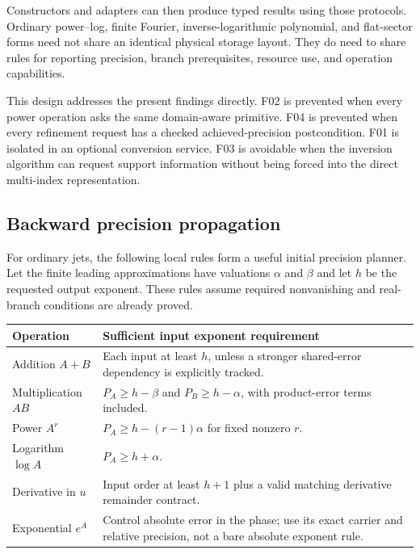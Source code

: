 \documentclass[11pt,a4paper]{article}
\theoremstyle{definition}
\begin{document}
Constructors and adapters can then produce typed results using those protocols. Ordinary power--log, finite Fourier, inverse-logarithmic polynomial, and flat-sector forms need not share an identical physical storage layout. They do need to share rules for reporting precision, branch prerequisites, resource use, and operation capabilities.

This design addresses the present findings directly. F02 is prevented when every power operation asks the same domain-aware primitive. F04 is prevented when every refinement request has a checked achieved-precision postcondition. F01 is isolated in an optional conversion service. F03 is avoidable when the inversion algorithm can request support information without being forced into the direct multi-index representation.

\subsection{Backward precision propagation}

For ordinary jets, the following local rules form a useful initial precision planner. Let the finite leading approximations have valuations $\alpha$ and $\beta$ and let $h$ be the requested output exponent. These rules assume required nonvanishing and real-branch conditions are already proved.
\begin{center}
\begin{tabularx}{\linewidth}{@{}P{32mm}Y@{}}
\toprule
Operation & Sufficient input exponent requirement\\
\midrule
Addition $A+B$ & Each input at least $h$, unless a stronger shared-error dependency is explicitly tracked.\\[3pt]
Multiplication $AB$ & $P_A\ge h-\beta$ and $P_B\ge h-\alpha$, with product-error terms included.\\[3pt]
Power $A^r$ & $P_A\ge h-(r-1)\alpha$ for fixed nonzero $r$.\\[3pt]
Logarithm $\log A$ & $P_A\ge h+\alpha$.\\[3pt]
Derivative in $u$ & Input order at least $h+1$ plus a valid matching derivative remainder contract.\\[3pt]
Exponential $e^A$ & Control absolute error in the phase; use its exact carrier and relative precision, not a bare absolute exponent rule.\\
\bottomrule
\end{tabularx}
\end{center}
\end{document}

